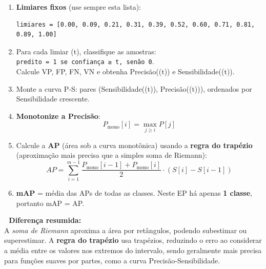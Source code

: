 \documentclass[
  portuguese,
  letterpaper,
  openany,
  oneside,
  12pt,
  a4paper]{book}
\begin{document}
\begin{enumerate}
\def\labelenumi{\arabic{enumi}.}
\item
  \textbf{Limiares fixos} (use sempre esta lista):

\begin{verbatim}
limiares = [0.00, 0.09, 0.21, 0.31, 0.39, 0.52, 0.60, 0.71, 0.81, 0.89, 1.00]
\end{verbatim}
\item
  Para cada limiar (t), classifique as amostras:
  \texttt{predito\ =\ 1\ se\ confiança\ ≥\ t,\ senão\ 0}.\\
  Calcule VP, FP, FN, VN e obtenha Precisão((t)) e Sensibilidade((t)).
\item
  Monte a curva P‑S: pares (Sensibilidade((t)), Precisão((t))),
  ordenados por Sensibilidade crescente.
\item
  \textbf{Monotonize a Precisão}:\\
  \[P_{\text{mono}}[i] = \max_{j \ge i} P[j]\]
\item
  Calcule a \textbf{AP} (área sob a curva monotônica) usando a
  \textbf{regra do trapézio} (aproximação mais precisa que a simples
  soma de Riemann):\\
  \[AP = \sum_{i=1}^{m-1} \frac{P_{\text{mono}}[i-1] + P_{\text{mono}}[i]}{2} \cdot (S[i] - S[i-1])\]
\item
  \textbf{mAP} = média das APs de todas as classes. Neste EP há apenas
  \textbf{1 classe}, portanto mAP = AP.
\end{enumerate}

\begin{tcolorbox}[enhanced jigsaw, colframe=quarto-callout-note-color-frame, opacitybacktitle=0.6, coltitle=black, rightrule=.15mm, bottomrule=.15mm, arc=.35mm, toprule=.15mm, breakable, opacityback=0, colbacktitle=quarto-callout-note-color!10!white, left=2mm, title=\textcolor{quarto-callout-note-color}{\faInfo}\hspace{0.5em}{Nota}, bottomtitle=1mm, toptitle=1mm, titlerule=0mm, leftrule=.75mm, colback=white]

\textbf{📐 Diferença resumida:}\\
A \emph{soma de Riemann} aproxima a área por retângulos, podendo
subestimar ou superestimar. A \textbf{regra do trapézio} usa trapézios,
reduzindo o erro ao considerar a média entre os valores nos extremos do
intervalo, sendo geralmente mais precisa para funções suaves por partes,
como a curva Precisão‑Sensibilidade.

\end{tcolorbox}
\end{document}
